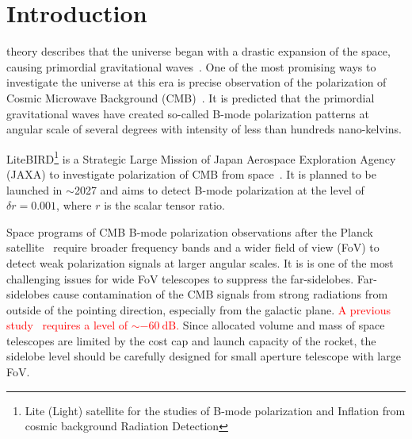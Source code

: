 \documentclass[journal]{IEEEtran}
\newcommand{\red}[1]{\textcolor{red}{#1}}
\begin{document}
\section{Introduction}
%
% 
% 
% 
% 
%
 theory describes that the universe began with a drastic expansion of the space, causing primordial gravitational waves~\cite{Sato1981, Guth1981}. One of the most promising ways to investigate the universe at this era is precise observation of the polarization of Cosmic Microwave Background (CMB)~\cite{Kamionkowski1997,Seljak1997}. It is predicted that the primordial gravitational waves have created so-called B-mode polarization patterns at angular scale of several degrees with intensity of less than hundreds nano-kelvins. 
\par
LiteBIRD\footnote{Lite (Light) satellite for the studies of B-mode polarization and Inflation from cosmic background Radiation Detection} is a Strategic Large Mission of Japan Aerospace Exploration Agency (JAXA) to investigate polarization of CMB from space~\cite{Hazumi2012, Sekimoto2018}. It is planned to be launched in $\sim$2027 and aims to detect B-mode polarization at the level of $\delta r = 0.001$, where $r$ is the scalar tensor ratio. 
\par
Space programs of CMB B-mode polarization observations after the Planck satellite~\cite{Planck2018} require broader frequency bands and a wider field of view (FoV) to detect weak polarization signals at larger angular scales. It is is one of the most challenging issues for wide FoV telescopes to suppress the far-sidelobes. Far-sidelobes cause contamination of the CMB signals from strong radiations from outside of the pointing direction, especially from the galactic plane.   
\red{A previous study~\cite{Tran2010} requires a level of $\sim -60~\mathrm{dB}$.}
Since allocated volume and mass of space telescopes are limited by the cost cap and launch capacity of the rocket, the sidelobe level should be carefully designed for small aperture telescope with large FoV.
 
\end{document}
